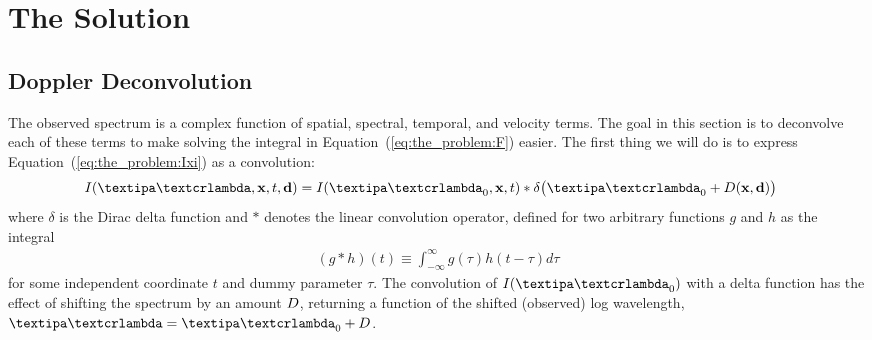 \documentclass[modern]{aastex631}
\begin{document}
\section{The Solution}
\label{sec:the_solution}

\subsection{Doppler Deconvolution}

The observed spectrum is a complex function of spatial, spectral, temporal, and velocity terms. 
The goal in this section is to deconvolve each of these terms to make solving the integral in Equation~(\ref{eq:the_problem:F}) easier.
%
The first thing we will do is to express Equation~(\ref{eq:the_problem:Ixi})
as a convolution:
%
\begin{align}
    \label{eq:deconv:convolution}
    I(\lnlam, \x, t, \Dargs) & =
    I(\lnlam_0, \x, t)
    *
    \delta\big(\lnlam_0 + \D(\x, \Dargs)\big)
\end{align}
%
where $\delta$ is the Dirac delta function and $*$ denotes the linear convolution operator, defined for two arbitrary functions $g$ and $h$ as the integral
%
\begin{align}
    \label{eq:deconv:convolution_def}
    (g * h)(t) \equiv \int_{-\infty}^\infty g(\tau) h(t - \tau) d\tau
\end{align}
%
for some independent coordinate $t$ and dummy parameter $\tau$.
%
The convolution of $I(\lnlam_0)$ with a delta function has the effect of shifting the spectrum by an amount $D$, returning a function of the shifted (observed) log wavelength, $\lnlam = \lnlam_0 + \D$.
\end{document}
